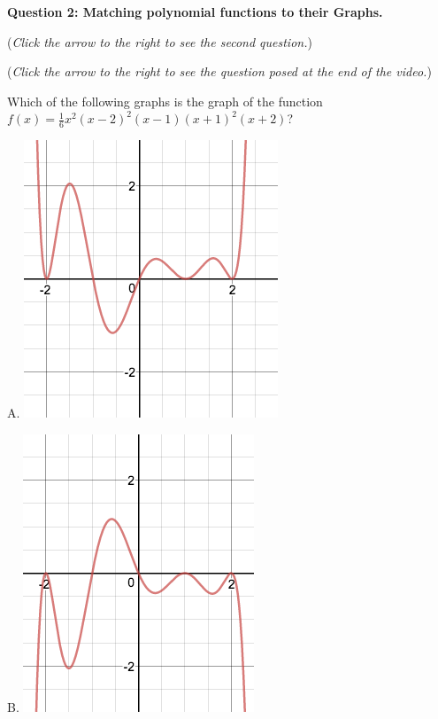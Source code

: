 \documentclass{ximera}
\begin{document}
\textbf{Question 2: Matching polynomial functions to their Graphs.}
\begin{question}
\begin{flushright}
{\color{blue}(\emph{Click the arrow to the right to see the second question.})}
\end{flushright}
\begin{center}
\begin{expandable}
\begin{flushright}
{\color{blue}(\emph{Click the arrow to the right to see the  question
posed at the end of the video.})}
\end{flushright}
\begin{expandable}
Which of the following graphs is the graph of the function $f(x) = \frac{1}{6}x^2(x-2)^2(x-1)(x+1)^2(x+2)$?
\begin{multicols}{3}
\begin{center}
A. \includegraphics[scale=0.25]{Graph1}
\end{center}

\begin{center}
B. \includegraphics[scale=0.25]{Graph2}
\end{center}
 

\end{multicols}
\end{expandable}
\end{expandable}
\end{center}
\end{question}
\end{document}
